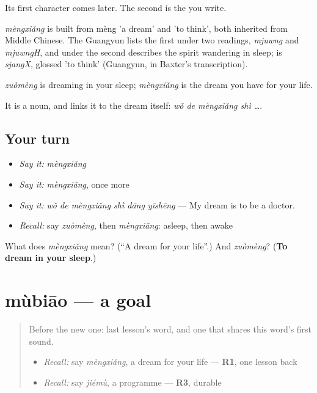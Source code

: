 Its first character comes later. The second is the  you write.

\begin{cousinweb}
\emph{mèngxiǎng} is built from mèng 'a dream' and  'to think', both inherited from Middle Chinese. The Guangyun lists the first under two readings, \emph{mjuwng} and \emph{mjuwngH}, and under the second describes the spirit wandering in sleep;  is \emph{sjangX}, glossed 'to think' (Guangyun, in Baxter's transcription).
\end{cousinweb}

\begin{grammarlens}[title={What you've built}]
\emph{zuòmèng} is dreaming in your sleep; \emph{mèngxiǎng} is the dream you have for your life.

It is a noun, and  links it to the dream itself: \emph{wǒ de mèngxiǎng shì …}.
\end{grammarlens}

\subsection*{Your turn}
\begin{itemize}
\raggedright
  \item \emph{Say it:} \emph{mèngxiǎng}
  \item \emph{Say it:} \emph{mèngxiǎng}, once more
  \item \emph{Say it:} \emph{wǒ de mèngxiǎng shì dāng yīshēng} — My dream is to be a doctor.
  \item \emph{Recall:} say \emph{zuòmèng}, then \emph{mèngxiǎng}: asleep, then awake
\end{itemize}

\begin{tcolorbox}[breakable,colback=teal!4,colframe=teal!35!black,title={Before you move on}]
What does \emph{mèngxiǎng} mean? (\textquotedblleft{}A dream for your life\textquotedblright{}.) And \emph{zuòmèng}? (\textbf{To dream in your sleep}.)
\end{tcolorbox}
\section[mùbiāo]{mùbiāo — a goal}

\label{lesson:ZH-C287-mubiao}



\begin{quote}
Before the new one: last lesson's word, and one that shares this word's first sound.

\begin{itemize}
\raggedright
  \item \emph{Recall:} say \emph{mèngxiǎng}, a dream for your life — \textbf{R1}, one lesson back
  \item \emph{Recall:} say \emph{jiémù}, a programme — \textbf{R3}, durable
\end{itemize}
\end{quote}

